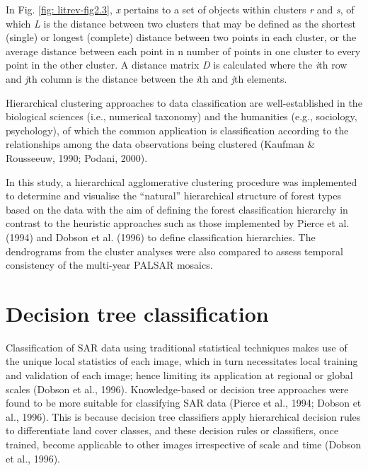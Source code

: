 In Fig. \ref{fig: litrev-fig2.3}, \textit{x} pertains to a set of objects within clusters \textit{r} and \textit{s}, of which \textit{L} is the distance between two clusters that may be defined as the shortest (single) or longest (complete) distance between two points in each cluster, or the average distance between each point in n number of points in one cluster to every point in the other cluster. A distance matrix \textit{D} is calculated where the \textit{i}th row and \textit{j}th column is the distance between the \textit{i}th and \textit{j}th elements.

Hierarchical clustering approaches to data classification are well-established in the biological sciences (i.e., numerical taxonomy) and the humanities (e.g., sociology, psychology), of which the common application is classification according to the relationships among the data observations being clustered (Kaufman \& Rousseeuw, 1990; Podani, 2000).

In this study, a hierarchical agglomerative clustering procedure was implemented to determine and visualise the \enquote{natural} hierarchical structure of forest types based on the data with the aim of defining the forest classification hierarchy in contrast to the heuristic approaches such as those implemented by Pierce et al. (1994) and Dobson et al. (1996) to define classification hierarchies. The dendrograms from the cluster analyses were also compared to assess temporal consistency of the multi-year PALSAR mosaics.

\section{Decision tree classification}
\label{sec: litrev-decision-tree}

Classification of SAR data using traditional statistical techniques makes use of the unique local statistics of each image, which in turn necessitates local training and validation of each image; hence limiting its application at regional or global scales (Dobson et al., 1996). Knowledge-based or decision tree approaches were found to be more suitable for classifying SAR data (Pierce et al., 1994; Dobson et al., 1996). This is because decision tree classifiers apply hierarchical decision rules to differentiate land cover classes, and these decision rules or classifiers, once trained, become applicable to other images irrespective of scale and time (Dobson et al., 1996).\\

